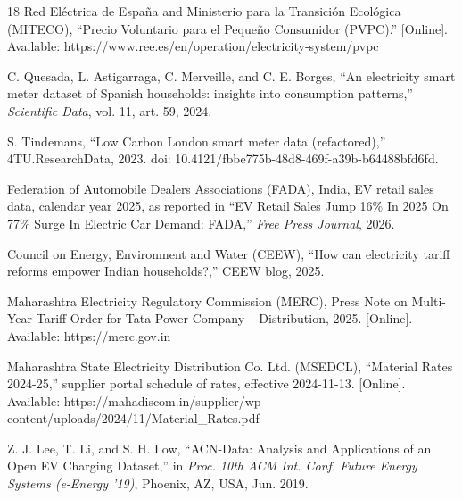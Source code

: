 \documentclass[journal]{IEEEtran}
\begin{document}
\begin{thebibliography}{18}
Red El\'ectrica de Espa\~na and Ministerio para la Transici\'on Ecol\'ogica (MITECO), ``Precio Voluntario para el Peque\~no Consumidor (PVPC).'' [Online]. Available: https://www.ree.es/en/operation/electricity-system/pvpc

C. Quesada, L. Astigarraga, C. Merveille, and C. E. Borges, ``An electricity smart meter dataset of Spanish households: insights into consumption patterns,'' \emph{Scientific Data}, vol. 11, art. 59, 2024.

S. Tindemans, ``Low Carbon London smart meter data (refactored),'' 4TU.ResearchData, 2023. doi: 10.4121/fbbe775b-48d8-469f-a39b-b64488bfd6fd.

Federation of Automobile Dealers Associations (FADA), India, EV retail sales data, calendar year 2025, as reported in ``EV Retail Sales Jump 16\% In 2025 On 77\% Surge In Electric Car Demand: FADA,'' \emph{Free Press Journal}, 2026.

Council on Energy, Environment and Water (CEEW), ``How can electricity tariff reforms empower Indian households?,'' CEEW blog, 2025.

Maharashtra Electricity Regulatory Commission (MERC), Press Note on Multi-Year Tariff Order for Tata Power Company -- Distribution, 2025. [Online]. Available: https://merc.gov.in

Maharashtra State Electricity Distribution Co. Ltd. (MSEDCL), ``Material Rates 2024-25,'' supplier portal schedule of rates, effective 2024-11-13. [Online]. Available: https://mahadiscom.in/supplier/wp-content/uploads/2024/11/Material\_Rates.pdf

Z. J. Lee, T. Li, and S. H. Low, ``ACN-Data: Analysis and Applications of an Open EV Charging Dataset,'' in \emph{Proc. 10th ACM Int. Conf. Future Energy Systems (e-Energy '19)}, Phoenix, AZ, USA, Jun. 2019.

\end{thebibliography}
\end{document}
